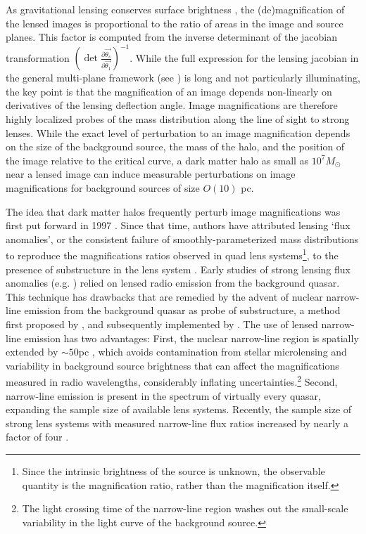 As gravitational lensing conserves surface brightness \citep{MisnerThorneWheeler}, the (de)magnification of the lensed images is proportional to the ratio of areas in the image and source planes. This factor is computed from the inverse determinant of the jacobian transformation $\left(\det \frac{\partial \vec{\theta_s}}{\partial \vec{\theta_1}}\right)^{-1}$. While the full expression for the lensing jacobian in the general multi-plane framework (see \citet{BlandfordNarayan86}) is long and not particularly illuminating, the key point is that the magnification of an image depends non-linearly on derivatives of the lensing deflection angle. Image magnifications are therefore highly localized probes of the mass distribution along the line of sight to strong lenses. While the exact level of perturbation to an image magnification depends on the size of the background source, the mass of the halo, and the position of the image relative to the critical curve, a dark matter halo as small as $10^7 M_{\odot}$ near a lensed image can induce measurable perturbations on image magnifications for background sources of size $O\left(10\right)$ pc. 

The idea that dark matter halos frequently perturb image magnifications was first put forward in 1997 \citep{MaoSchneider98}. Since that time, authors have attributed lensing `flux anomalies', or the consistent failure of smoothly-parameterized mass distributions to reproduce the magnifications ratios observed in quad lens systems\footnote{Since the intrinsic brightness of the source is unknown, the observable quantity is the magnification ratio, rather than the magnification itself.}, to the presence of substructure in the lens system \citep{Metcalf++02,D+K02,Xu++12,Xu++15}. Early studies of strong lensing flux anomalies (e.g. \citep{D+K02}) relied on lensed radio emission from the background quasar. This technique has drawbacks that are remedied by the advent of nuclear narrow-line emission from the background quasar as probe of substructure, a method first proposed by \citet{MoustakasMetcalf02}, and subsequently implemented by \citet{Sugai++07,Nierenberg++14,Nierenberg++17,Nierenberg++19}. The use of lensed narrow-line emission has two advantages: First, the nuclear narrow-line region is spatially extended by $\sim 50$pc \citep{MullerSanchez++11}, which avoids contamination from stellar microlensing and variability in background source brightness that can affect the magnifications measured in radio wavelengths, considerably inflating uncertainties.\footnote{The light crossing time of the narrow-line region washes out the small-scale variability in the light curve of the background source.} Second, narrow-line emission is present in the spectrum of virtually every quasar, expanding the sample size of available lens systems. Recently, the sample size of strong lens systems with measured narrow-line flux ratios increased by nearly a factor of four \citep{Nierenberg++19}. 

